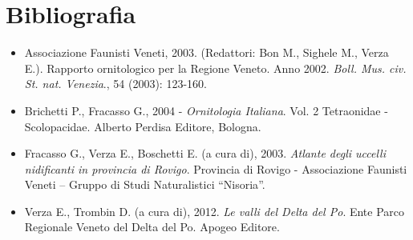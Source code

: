\section*{Bibliografia}
\begin{itemize}\itemsep0pt
 \item Associazione Faunisti Veneti, 2003. (Redattori: Bon M., Sighele M.,
Verza E.). Rapporto ornitologico per la Regione Veneto. Anno 2002.
\textit{Boll. Mus. civ. St. nat. Venezia}., 54 (2003): 123-160.

 \item Brichetti P., Fracasso G., 2004 - \textit{Ornitologia Italiana}. Vol. 2
Tetraonidae - Scolopacidae. Alberto Perdisa Editore, Bologna.

 \item Fracasso G., Verza E., Boschetti E. (a cura di), 2003.  \textit{Atlante
degli uccelli nidificanti in provincia di Rovigo}. Provincia di Rovigo
- Associazione Faunisti Veneti -- Gruppo di Studi Naturalistici
{\textquotedblleft}Nisoria{\textquotedblright}.

 \item Verza E., Trombin D. (a cura di), 2012. \textit{Le valli del Delta del
Po}. Ente Parco Regionale Veneto del Delta del Po. Apogeo Editore.
\end{itemize}
